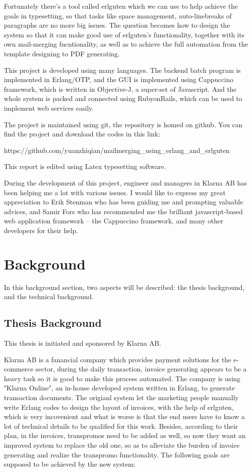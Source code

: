 \documentclass{report}
\begin{document}
  Fortunately there's a tool called erlguten which we can use to help achieve the goals in typesetting, so that tasks like space management, auto-linebreaks of paragraphs are no more big issues. The question becomes how to design the system so that it can make good use of erlguten's functionality, together with its own mail-merging fucntionality, as well as to achieve the full automation from the template designing to PDF generating.

  This project is developed using many languages. The backend batch program is implemented in Erlang/OTP, and the GUI is implemented using Cappuccino framework, which is written in Objective-J, a super-set of Javascript. And the whole system is packed and connected using RubyonRails, which can be used to implement web services easily. 

  The project is maintained using git, the repository is homed on github. You can find the project and download the codes in this link: 

  https://github.com/yuanzhiqian/mailmerging\_using\_erlang\_and\_erlguten

  This report is edited using Latex typesetting software.

  During the development of this project, engineer and managers in Klarna AB has been helping me a lot with various issues. I would like to express my great appreciation to Erik Stenman who has been guiding me and prompting valuable advices, and Samir Fors who has recommended me the brilliant javascript-based web application framework -- the Cappuccino framework, and many other developers for their help. 

\section{Background}
  In this background section, two aspects will be described: the thesis background, and the technical background.
\subsection{Thesis Background}
  This thesis is initiated and sponsored by Klarna AB.

  Klarna AB is a fanancial company which provides payment solutions for the e-commerce sector, during the daily transaction, invoice generating appears to be a heavy task so it is good to make this process automated. The company is using "Klarna Online", an in-house developed system written in Erlang, to generate transaction documents. The origianl system let the marketing people manually write Erlang codes to design the layout of invoices, with the help of erlguten, which is very incovenient and what is worse is that the end users have to know a lot of technical details to be qualified for this work. Besides, according to their plan, in the invoices, transpromos need to be added as well, so now they want an improved system to replace the old one, so as to alleviate the burden of invoice generating and realize the transpromo functionality. The following goals are supposed to be achieved by the new system:
\end{document}
